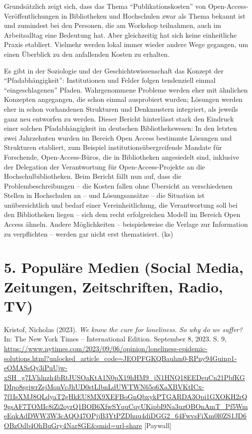 \documentclass[a4paper,
fontsize=11pt,
oneside,
numbers=noperiodatend,
parskip=half-,
bibliography=totoc,
final
]{scrartcl}
\begin{document}
Grundsätzlich zeigt sich, dass das Thema \enquote{Publikationskosten}
von Open-Access-Veröffentli\-chungen in Bibliotheken und Hochschulen zwar
als Thema bekannt ist und zumindest bei den Personen, die am Workshop
teilnahmen, auch im Arbeitsalltag eine Bedeutung hat. Aber gleichzeitig
hat sich keine einheitliche Praxis etabliert. Vielmehr werden lokal
immer wieder andere Wege gegangen, um einen Überblick zu den anfallenden
Kosten zu erhalten.

Es gibt in der Soziologie und der Geschichtswissenschaft das Konzept der
\enquote{Pfadabhängigkeit}: Institutionen und Felder folgen tendenziell
einmal \enquote{eingeschlagenen} Pfaden. Wahrgenommene Probleme werden
eher mit ähnlichen Konzepten angegangen, die schon einmal ausprobiert
wurden; Lösungen werden eher in schon vorhandenen Strukturen und
Denkmustern integriert, als jeweils ganz neu entworfen zu werden. Dieser
Bericht hinterlässt stark den Eindruck einer solchen Pfadabhängigkeit im
deutschen Bibliothekswesen: In den letzten zwei Jahrzehnten wurden im
Bereich Open Access bestimmte Lösungen und Strukturen etabliert, zum
Beispiel institutionsübergreifende Mandate für Forschende,
Open-Access-Büros, die in Bibliotheken angesiedelt sind, inklusive der
Delegation der Verantwortung für Open-Access-Projekte an die
Hochschulbibliotheken. Beim Bericht fällt nun auf, dass die
Problembeschreibungen -- die Kosten fallen ohne Übersicht an
verschiedenen Stellen in Hochschulen an -- und Lösungsansätze -- die
Situation ist unübersichtlich und bedarf einer Vereinheitlichung, die
Verantwortung soll bei den Bibliotheken liegen -- sich dem recht
erfolgreichen Modell im Bereich Open Access ähneln. Andere Möglichkeiten
-- beispielsweise die Verlage zur Information zu verpflichten -- werden
gar nicht erst thematisiert. (ks)

\hypertarget{populuxe4re-medien-social-media-zeitungen-zeitschriften-radio-tv}{%
\section{5. Populäre Medien (Social Media, Zeitungen,
Zeitschriften, Radio,
TV)}\label{populuxe4re-medien-social-media-zeitungen-zeitschriften-radio-tv}}

Kristof, Nicholas (2023). \emph{We know the cure for loneliness. So why
do we suffer?} In: The New York Times -- International Edition.
September 8, 2023. S. 9,
\url{https://www.nytimes.com/2023/09/06/opinion/loneliness-epidemic-solutions.html?unlocked_article_code=JEOPFGKQBauhm0-RPny94Guinp1-eOMASsQy3iPuUjw-xSH_g7LVhlnzh4bRtJUSOaKtA1N0pX19hHM9_jN1HNQ18EEDeuCn21PbfKGDIpo8sgiwrZsjMqnVcJhUD0stLlbnLdUWTWN65q6XaXBVKtICx-7f1IsXMJ8QLdyaT2gHkEU8MX9XEFBoGnQbxykPTGARDA3Opi1GXOKH2rQ9gsAF7TOMIc8iZi2oyrQ1BOB6XfwSYquCqyUKipbI9Na3uzOBOnAmT_Pf5WmeEqkAdDWW3W3cAQO47OPjjB3YtPZDhuu4diDGG2_64FwvsFiXm0l0ZS1JD6OBzOdb4OhBuGry4Nar8GE\&smid=url-share}
{[}Paywall{]}
\end{document}
